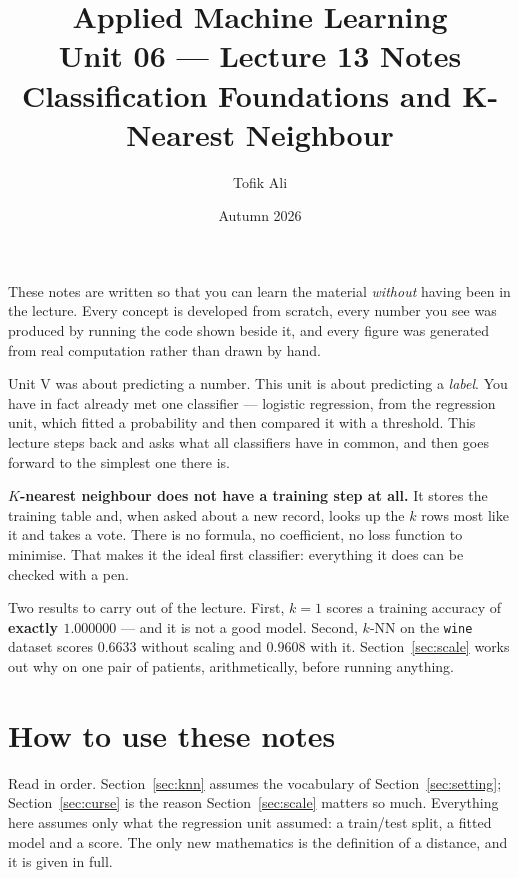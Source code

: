 \documentclass[11pt]{article}
\title{Applied Machine Learning\\Unit 06 --- Lecture 13 Notes\\
       Classification Foundations and K-Nearest Neighbour}
\author{Tofik Ali}
\date{Autumn 2026}
\begin{document}
\maketitle

\begin{keyidea}
These notes are written so that you can learn the material \emph{without}
having been in the lecture. Every concept is developed from scratch, every
number you see was produced by running the code shown beside it, and every
figure was generated from real computation rather than drawn by hand.

Unit V was about predicting a number. This unit is about predicting a
\emph{label}. You have in fact already met one classifier --- logistic
regression, from the regression unit, which fitted a probability and then
compared it with a threshold. This lecture steps back and asks what all
classifiers have in common, and then goes forward to the simplest one there
is.

\textbf{$K$-nearest neighbour does not have a training step at all.} It stores
the training table and, when asked about a new record, looks up the $k$ rows
most like it and takes a vote. There is no formula, no coefficient, no loss
function to minimise. That makes it the ideal first classifier: everything it
does can be checked with a pen.

Two results to carry out of the lecture. First, $k=1$ scores a training
accuracy of \textbf{exactly $1.000000$} --- and it is not a good model. Second,
$k$-NN on the \texttt{wine} dataset scores \textbf{$0.6633$} without scaling
and \textbf{$0.9608$} with it. Section~\ref{sec:scale} works out why on one
pair of patients, arithmetically, before running anything.
\end{keyidea}

\tableofcontents
\medskip

\section{How to use these notes}
\label{sec:how}

Read in order. Section~\ref{sec:knn} assumes the vocabulary of
Section~\ref{sec:setting}; Section~\ref{sec:curse} is the reason
Section~\ref{sec:scale} matters so much. Everything here assumes only what the
regression unit assumed: a train/test split, a fitted model and a score. The
only new mathematics is the definition of a distance, and it is given in full.
\end{document}
